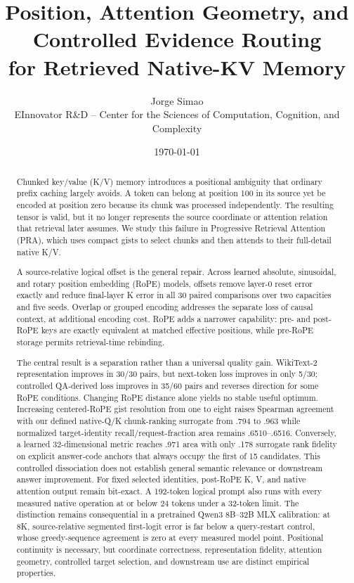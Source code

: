 \documentclass[11pt]{article}
\title{Position, Attention Geometry, and Controlled Evidence Routing\\for Retrieved Native-KV Memory}
\author{Jorge Simao\\EInnovator R\&D -- Center for the Sciences of Computation, Cognition, and Complexity}
\date{\today}
\begin{document}
\maketitle

\begin{abstract}
Chunked key/value (K/V) memory introduces a positional ambiguity that ordinary prefix
caching largely avoids. A token can belong at position 100 in its source yet be encoded at
position zero because its chunk was processed independently. The resulting tensor is valid,
but it no longer represents the source coordinate or attention relation that retrieval later
assumes. We study this failure in Progressive Retrieval Attention (PRA), which uses compact
gists to select chunks and then attends to their full-detail native K/V.

A source-relative logical offset is the general repair. Across learned absolute, sinusoidal,
and rotary position embedding (RoPE) models, offsets remove layer-0 reset error exactly and
reduce final-layer K error in all 30 paired comparisons over two capacities and five seeds.
Overlap or grouped encoding addresses the separate loss of causal context, at additional
encoding cost. RoPE adds a narrower capability: pre- and post-RoPE keys are exactly equivalent
at matched effective positions, while pre-RoPE storage permits retrieval-time rebinding.

The central result is a separation rather than a universal quality gain. WikiText-2
representation improves in 30/30 pairs, but next-token loss improves in only 5/30; controlled
QA-derived loss improves in 35/60 pairs and reverses direction for some RoPE conditions.
Changing RoPE distance alone yields no stable useful optimum. Increasing centered-RoPE gist
resolution from one to eight raises Spearman agreement with our defined native-Q/K
chunk-ranking surrogate from .794 to .963 while normalized target-identity
recall/request-fraction area remains .6510--.6516. Conversely, a learned 32-dimensional metric
reaches .971 area with only .178 surrogate rank fidelity on explicit answer-code anchors that
always occupy the first of 15 candidates. This controlled dissociation does not establish
general semantic relevance or downstream answer improvement. For fixed selected identities,
post-RoPE K, V, and native attention output remain bit-exact. A 192-token logical prompt also runs with every measured
native operation at or below 24 tokens under a 32-token limit. The distinction
remains consequential in a pretrained Qwen3 8B--32B MLX calibration: at 8K,
source-relative segmented first-logit error is far below a query-restart control,
whose greedy-sequence agreement is zero at every measured model point.
Positional continuity is
necessary, but coordinate correctness, representation fidelity, attention geometry, controlled
target selection, and downstream use are distinct empirical properties.
\end{abstract}
\end{document}
